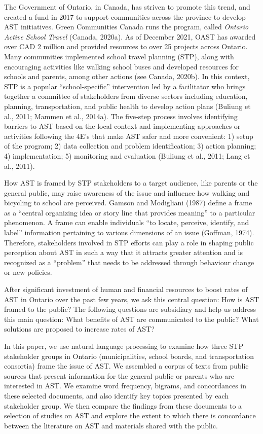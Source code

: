 \documentclass[]{elsarticle} %
\begin{document}
The Government of Ontario, in Canada, has striven to promote this trend,
and created a fund in 2017 to support communities across the province to
develop AST initiatives. Green Communities Canada runs the program,
called \emph{Ontario Active School Travel} (Canada, 2020a). As of
December 2021, OAST has awarded over CAD 2 million and provided
resources to over 25 projects across Ontario. Many communities
implemented school travel planning (STP), along with encouraging
activities like walking school buses and developed resources for schools
and parents, among other actions (see Canada, 2020b). In this context,
STP is a popular ``school-specific'' intervention led by a facilitator
who brings together a committee of stakeholders from diverse sectors
including education, planning, transportation, and public health to
develop action plans (Buliung et al., 2011; Mammen et al., 2014a). The
five-step process involves identifying barriers to AST based on the
local context and implementing approaches or activities following the
4E's that make AST safer and more convenient: 1) setup of the program;
2) data collection and problem identification; 3) action planning; 4)
implementation; 5) monitoring and evaluation (Buliung et al., 2011; Lang
et al., 2011).

How AST is framed by STP stakeholders to a target audience, like parents
or the general public, may raise awareness of the issue and influence
how walking and bicycling to school are perceived. Gamson and Modigliani
(1987) define a frame as a ``central organizing idea or story line that
provides meaning'' to a particular phenomenon. A frame can enable
individuals ``to locate, perceive, identify, and label'' information
pertaining to various dimensions of an issue (Goffman, 1974). Therefore,
stakeholders involved in STP efforts can play a role in shaping public
perception about AST in such a way that it attracts greater attention
and is recognized as a ``problem'' that needs to be addressed through
behaviour change or new policies.

After significant investment of human and financial resources to boost
rates of AST in Ontario over the past few years, we ask this central
question: How is AST framed to the public? The following questions are
subsidiary and help us address this main question: What benefits of AST
are communicated to the public? What solutions are proposed to increase
rates of AST?

In this paper, we use natural language processing to examine how three
STP stakeholder groups in Ontario (municipalities, school boards, and
transportation consortia) frame the issue of AST. We assembled a corpus
of texts from public sources that present information for the general
public or parents who are interested in AST. We examine word frequency,
bigrams, and concordances in these selected documents, and also identify
key topics presented by each stakeholder group. We then compare the
findings from these documents to a selection of studies on AST and
explore the extent to which there is concordance between the literature
on AST and materials shared with the public.
\end{document}
